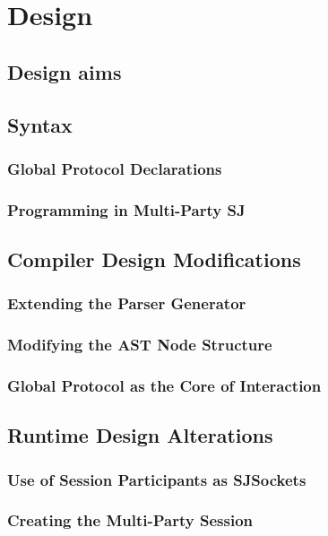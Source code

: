 \chapter{Design}
\label{ch:design}

\section{Design aims}

\section{Syntax}

\subsection{Global Protocol Declarations}

\subsection{Programming in Multi-Party SJ}



\section{Compiler Design Modifications}

\subsection{Extending the Parser Generator}

\subsection{Modifying the AST Node Structure}

\subsection{Global Protocol as the Core of Interaction}



\section{Runtime Design Alterations}

\subsection{Use of Session Participants as SJSockets}

\subsection{Creating the Multi-Party Session}